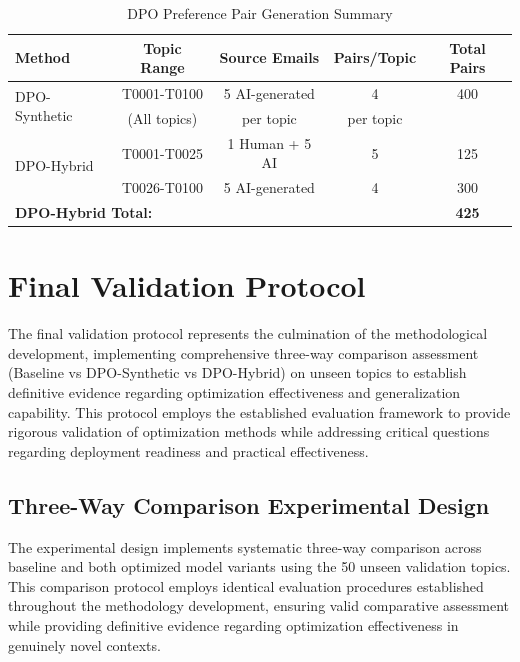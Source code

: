 \begin{table}[htbp]
    \centering
    \caption{DPO Preference Pair Generation Summary}
    \label{tab:dpo-data-preparation}
    \begin{tabular}{|l|c|c|c|c|}
    \hline
    \textbf{Method} & \textbf{Topic Range} & \textbf{Source Emails} & \textbf{Pairs/Topic} & \textbf{Total Pairs} \\
    \hline
    \multirow{2}{*}{DPO-Synthetic} & T0001-T0100 & 5 AI-generated & 4 & 400 \\
    & (All topics) & per topic & per topic & \\
    \hline
    \multirow{2}{*}{DPO-Hybrid} & T0001-T0025 & 1 Human + 5 AI & 5 & 125 \\
    & T0026-T0100 & 5 AI-generated & 4 & 300 \\
    \hline
    \multicolumn{4}{|l|}{\textbf{DPO-Hybrid Total:}} & \textbf{425} \\
    \hline
    \end{tabular}
\end{table}

\section{Final Validation Protocol}
\label{sec:final-validation-protocol}

The final validation protocol represents the culmination of the methodological development, implementing comprehensive three-way comparison assessment (Baseline vs DPO-Synthetic vs DPO-Hybrid) on unseen topics to establish definitive evidence regarding optimization effectiveness and generalization capability. This protocol employs the established evaluation framework to provide rigorous validation of optimization methods while addressing critical questions regarding deployment readiness and practical effectiveness.

\subsection{Three-Way Comparison Experimental Design}

The experimental design implements systematic three-way comparison across baseline and both optimized model variants using the 50 unseen validation topics. This comparison protocol employs identical evaluation procedures established throughout the methodology development, ensuring valid comparative assessment while providing definitive evidence regarding optimization effectiveness in genuinely novel contexts.

